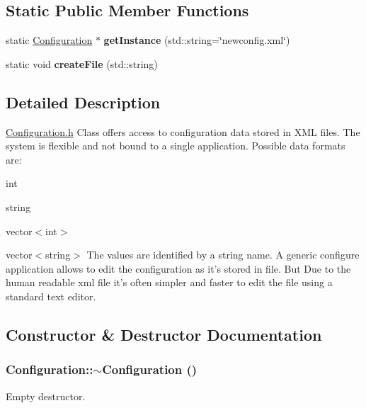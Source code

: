 \subsection*{Static Public Member Functions}
\begin{DoxyCompactItemize}
\item 
\hypertarget{classConfiguration_acad52c9f0ce2a52bd1bb21de2738dc03}{
static \hyperlink{classConfiguration}{Configuration} $\ast$ {\bfseries getInstance} (std::string=\char`\"{}newconfig.xml\char`\"{})}
\label{classConfiguration_acad52c9f0ce2a52bd1bb21de2738dc03}

\item 
\hypertarget{classConfiguration_afde285d96561ccd57a257f4cb774f11d}{
static void {\bfseries createFile} (std::string)}
\label{classConfiguration_afde285d96561ccd57a257f4cb774f11d}

\end{DoxyCompactItemize}


\subsection{Detailed Description}
\hyperlink{Configuration_8h_source}{Configuration.h} Class offers access to configuration data stored in XML files. The system is flexible and not bound to a single application. Possible data formats are:
\begin{DoxyItemize}
\item int
\item string
\item vector$<$int$>$
\item vector$<$string$>$ The values are identified by a string name. A generic configure application allows to edit the configuration as it's stored in file. But Due to the human readable xml file it's often simpler and faster to edit the file using a standard text editor. 
\end{DoxyItemize}

\subsection{Constructor \& Destructor Documentation}
\hypertarget{classConfiguration_a0dd0fa189e239f4c9a036303f641441e}{
\subsubsection[{$\sim$Configuration}]{\setlength{\rightskip}{0pt plus 5cm}Configuration::$\sim$Configuration ()}}
\label{classConfiguration_a0dd0fa189e239f4c9a036303f641441e}
Empty destructor. 


